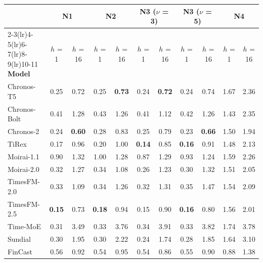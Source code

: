 \begin{tabular}{@{}lcccccccccc@{}}
\toprule
 & \multicolumn{2}{c}{\textbf{N1}} & \multicolumn{2}{c}{\textbf{N2}} & \multicolumn{2}{c}{\textbf{N3 ($\nu$ = 3)}} & \multicolumn{2}{c}{\textbf{N3 ($\nu$ = 5)}} & \multicolumn{2}{c}{\textbf{N4}} \\
\cmidrule(lr){2-3}\cmidrule(lr){4-5}\cmidrule(lr){6-7}\cmidrule(lr){8-9}\cmidrule(lr){10-11}
\textbf{Model} & $h$ = 1 & $h$ = 16 & $h$ = 1 & $h$ = 16 & $h$ = 1 & $h$ = 16 & $h$ = 1 & $h$ = 16 & $h$ = 1 & $h$ = 16 \\
\midrule
Chronos-T5 & 0.25 & 0.72 & 0.25 & \textbf{0.73} & 0.24 & \textbf{0.72} & 0.24 & 0.74 & 1.67 & 2.36 \\
Chronos-Bolt & 0.41 & 1.28 & 0.43 & 1.26 & 0.41 & 1.12 & 0.42 & 1.26 & 1.43 & 2.35 \\
Chronos-2 & 0.24 & \textbf{0.60} & 0.28 & 0.83 & 0.25 & 0.79 & 0.23 & \textbf{0.66} & 1.50 & 1.94 \\
TiRex & 0.17 & 0.96 & 0.20 & 1.00 & \textbf{0.14} & 0.85 & \textbf{0.16} & 0.91 & 1.48 & 2.13 \\
Moirai-1.1 & 0.90 & 1.32 & 1.00 & 1.28 & 0.87 & 1.29 & 0.93 & 1.24 & 1.59 & 2.26 \\
Moirai-2.0 & 0.32 & 1.27 & 0.34 & 1.08 & 0.26 & 1.23 & 0.30 & 1.32 & 1.51 & 2.05 \\
TimesFM-2.0 & 0.33 & 1.09 & 0.34 & 1.26 & 0.32 & 1.31 & 0.35 & 1.47 & 1.54 & 2.09 \\
TimesFM-2.5 & \textbf{0.15} & 0.73 & \textbf{0.18} & 0.94 & 0.15 & 0.90 & \textbf{0.16} & 0.80 & 1.56 & 2.01 \\
Time-MoE & 0.31 & 3.49 & 0.33 & 3.76 & 0.34 & 3.91 & 0.33 & 3.82 & 1.74 & 3.78 \\
Sundial & 0.30 & 1.95 & 0.30 & 2.22 & 0.24 & 1.74 & 0.28 & 1.85 & 1.64 & 3.10 \\
FinCast & 0.56 & 0.92 & 0.54 & 0.95 & 0.54 & 0.86 & 0.55 & 0.90 & 0.88 & 1.38 \\
\bottomrule
\end{tabular}
